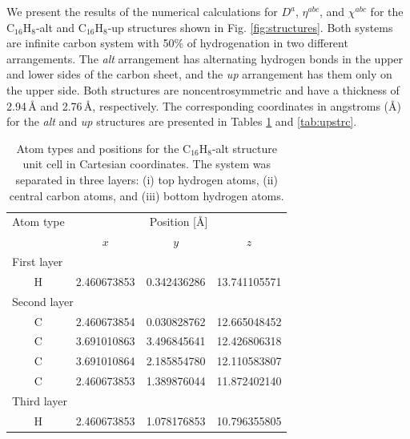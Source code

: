 \documentclass[pss]{wiley2sp} %
\begin{document}
We present the results of the numerical calculations for {$D^{a}$}, {$\eta^{abc}$}, and $\chi^{abc}$ for the C$_{16}$H$_{8}$-alt and C$_{16}$H$_{8}$-up structures shown in Fig. \ref{fig:structures}. Both systems are infinite carbon system with 50\% of hydrogenation in two different arrangements. The \emph{alt} arrangement has alternating hydrogen bonds in the upper and lower sides of the carbon sheet, and the \emph{up} arrangement has them only on the upper side. Both structures are noncentrosymmetric and have a thickness of 2.94\,{\AA} and 2.76\,{\AA}, respectively. The corresponding coordinates in angstroms (\AA) for the \emph{alt} and \emph{up} structures are presented in Tables \ref{tab:altstrc} and \ref{tab:upstrc}.
\begin{table}[t]
  \begin{tabular}{cccc}
  \hline
  Atom type &  \multicolumn{3}{c}{Position [\AA] } \\
  \cline{2-4}
  & $x$ & $y$ & $z$ \\
  \hline
  \multicolumn{2}{l}{First layer}\\
H & 2.460673853 & 0.342436286 & 13.741105571 \\
  \multicolumn{2}{l}{Second layer}\\
C & 2.460673854 & 0.030828762 & 12.665048452 \\
C & 3.691010863 & 3.496845641 & 12.426806318 \\
C & 3.691010864 & 2.185854780 & 12.110583807 \\
C & 2.460673853 & 1.389876044 & 11.872402140 \\
  \multicolumn{2}{l}{Third layer}\\
H & 2.460673853 & 1.078176853 & 10.796355805 \\
  \hline
  \end{tabular}
  \caption[]{%
  Atom types and positions for the C$_{16}$H$_{8}$-alt structure unit cell in Cartesian coordinates. The system was separated in three layers: (i) top hydrogen atoms, (ii) central carbon atoms, and (iii) bottom hydrogen atoms. }
  \label{tab:altstrc}
\end{table}
\end{document}
